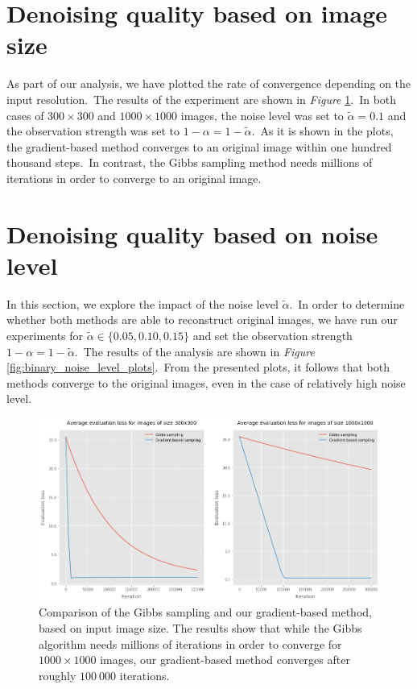 \documentclass[a4paper, 11pt, onecolumn, openany, titlepage]{report}
\theoremstyle{default_theorem_style}\newtheorem{theorem}{Theorem}
\theoremstyle{default_theorem_style}\newtheorem{definition}{Definition}
\begin{document}
\section{Denoising quality based on image size}

As part of our analysis, we have plotted the rate of convergence depending on the input resolution.\ The
results of the experiment are shown in \textit{Figure} \ref{fig:binary_input_size_plots}.\ In
both cases of $300{\times}300$ and $1000{\times}1000$ images, the noise level was set to $\tilde{\alpha} = 0.1$
and the observation strength was set to $1 - \alpha = 1 - \tilde{\alpha}$.\ As it is shown in the plots,
the gradient-based method converges to an original image within one hundred thousand steps.\ In contrast,
the Gibbs sampling method needs millions of iterations in order to converge to an original image.

\section{Denoising quality based on noise level}

In this section, we explore the impact of the noise level $\tilde{\alpha}$.\ In order to determine whether both
methods are able to reconstruct original images, we have run our experiments for
$\tilde{\alpha} \in \{0.05, 0.10, 0.15\}$ and set the observation strength $1 - \alpha = 1 - \tilde{\alpha}$.\ The
results of the analysis are shown in \textit{Figure} \ref{fig:binary_noise_level_plots}.\ From the presented
plots, it follows that both methods converge to the original images, even in the case of relatively high noise level.

\begin{figure}[H]
\centering
\includegraphics[scale=0.42]{binary_input_size_plots}
\caption{Comparison of the Gibbs sampling and our gradient-based method, based on input image size. The results
show that while the Gibbs algorithm needs millions of iterations in order to converge for $1000{\times}1000$ images, our
gradient-based method converges after roughly $100\ 000$ iterations.}
\label{fig:binary_input_size_plots}
\end{figure}
\end{document}

